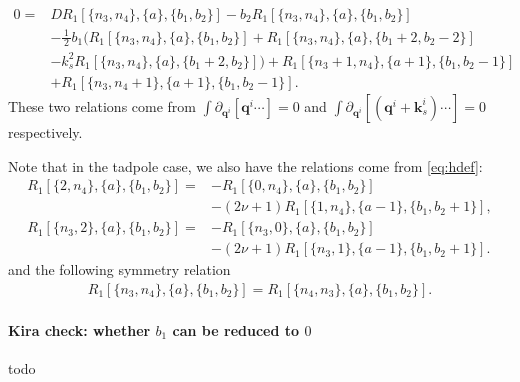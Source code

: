 \documentclass[a4paper]{article}
\newcommand{\FR}[2]{\displaystyle\frac{\,{#1}\,}{#2}}
\def\pd{\partial}
\begin{document}
\begin{align}
	0 = & D R_1[\{n_3,n_4\},\{a\},\{b_1,b_2\}] - b_2 R_1[\{n_3,n_4\},\{a\},\{b_1,b_2\}] \nonumber                    \\
	    & - \FR12 b_1\Big( R_1[\{n_3,n_4\},\{a\},\{b_1,b_2\}] + R_1[\{n_3,n_4\},\{a\},\{b_1+2,b_2-2\}] \nonumber     \\
	    & -k_s^2 R_1[\{n_3,n_4\},\{a\},\{b_1+2,b_2\}] \Big)+ R_1[\{n_3+1,n_4\},\{a+1\},\{b_1,b_2-1\}] \nonumber \\
     &+ R_1[\{n_3,n_4+1\},\{a+1\},\{b_1,b_2-1\}]. \label{eq:R1momIBP2}
\end{align}
These two relations come from $\int \pd_{\bm q^i}[\bm q^i\cdots]=0$ and $\int \pd_{\bm q^i}[(\bm q^i+\bm k_s^i)\cdots]=0$ respectively.

Note that in the tadpole case, we also have the relations come from \eqref{eq:hdef}:
\begin{align}
	R_1[\{2,n_4\},\{a\},\{b_1,b_2\}] = & - R_1[\{0,n_4\},\{a\},\{b_1,b_2\}] \nonumber                            \\
 & - (2\nu+1) R_1[\{1,n_4\},\{a-1\},\{b_1,b_2+1\}], \label{eq:R1eom1} \\
	R_1[\{n_3,2\},\{a\},\{b_1,b_2\}] = & - R_1[\{n_3,0\},\{a\},\{b_1,b_2\}] \nonumber                            \\
& - (2\nu+1) R_1[\{n_3,1\},\{a-1\},\{b_1,b_2+1\}]. \label{eq:R1eom2}
\end{align}
and the following symmetry relation
\begin{align}
	 R_1[\{n_3,n_4\},\{a\},\{b_1,b_2\}] = R_1[\{n_4,n_3\},\{a\},\{b_1,b_2\}] \label{eq:R1sym}. 
\end{align}







\paragraph{Kira check: whether $b_1$ can be reduced to $0$}
todo
\end{document}
